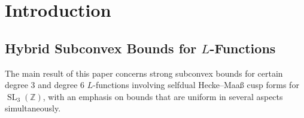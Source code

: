 \documentclass[11pt,a4paper]{amsart}
\newcommand{\Z}{\mathbb{Z}}
\DeclareMathOperator{\GL}{GL}
\DeclareMathOperator{\SL}{SL}
\numberwithin{equation}{section}
\theoremstyle{remark}
\theoremstyle{definition}
\begin{document}
\begin{abstract}
We prove strong hybrid subconvex bounds simultaneously in the $q$ and $t$ aspects for $L$-functions of selfdual $\GL_3$ cusp forms twisted by primitive Dirichlet characters. We additionally prove analogous hybrid subconvex bounds for central values of certain $\GL_3 \times \GL_2$ Rankin--Selberg $L$-functions. The subconvex bounds that we obtain are strong in the sense that, modulo current knowledge on estimates for the second moment of $\GL_3$ $L$-functions, they are the natural limit of the first moment method pioneered by Li and by Blomer.

The method of proof relies on an explicit $\GL_3 \times \GL_2 \leftrightsquigarrow \GL_4 \times \GL_1$ spectral reciprocity formula, which relates a $\GL_2$ moment of $\GL_3 \times \GL_2$ Rankin--Selberg $L$-functions to a $\GL_1$ moment of $\GL_4 \times \GL_1$ Rankin--Selberg $L$-functions. A key additional input is a Lindel\"{o}f-on-average upper bound for the second moment of Dirichlet $L$-functions restricted to a coset, which is of independent interest.
\end{abstract}

\maketitle


\section{Introduction}

\subsection{Hybrid Subconvex Bounds for \texorpdfstring{$L$}{L}-Functions}

The main result of this paper concerns strong subconvex bounds for certain degree $3$ and degree $6$ $L$-functions involving selfdual Hecke--Maa\ss{} cusp forms for $\SL_3(\Z)$, with an emphasis on bounds that are uniform in several aspects simultaneously.
\end{document}
